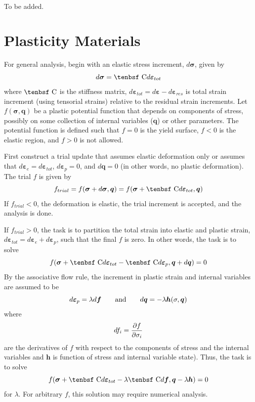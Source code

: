 \documentclass[11pt]{article}
\renewcommand{\vec}[1]{\boldsymbol{#1}}
\def\C{\hbox{\tenbsf C}}
\def\del{d \vec{\varepsilon}_{e}}
\def\dpl{d \vec{\varepsilon}_{p}}
\def\deff{d \vec{\varepsilon}_{tot}}
\def\df{d \vec{f}}
\def\dsig{d \vec{\sigma}}
\def\dq{d\vec q}
\begin{document}
To be added.

\section{Plasticity Materials}

For general analysis, begin with an elastic stress increment, $\dsig$, given by
\begin{equation}
    \dsig = \C \deff 
\end{equation}
where $\C$ is the stiffness matrix, $\deff=d\vec\varepsilon-d\vec\varepsilon_{res}$ is total strain increment (using tensorial strains) relative to the residual strain increments. Let $f(\vec{\sigma},\vec q)$ be a plastic potential function that depends on components of stress, possibly on some collection of internal variables ($\vec q$) or other parameters. The potential function is defined such that $f=0$ is the yield surface, $f<0$ is the elastic region, and $f>0$ is not allowed.

First construct a trial update that assumes elastic deformation only or assumes that $\del=\deff$, $\dpl=0$, and $d\vec q=0$ (in other words, no plastic deformation). The trial $f$ is given by\begin{equation}
       f_{trial} = f(\vec\sigma + \dsig,\vec q) = f(\vec\sigma + \C \deff ,\vec q)
\end{equation}
If $f_{trial}<0$, the deformation is elastic, the trial increment is accepted, and the analysis is done.

If $f_{trial}>0$, the task is to partition the total strain into elastic and plastic strain, $\deff=\del+\dpl$, such that the final $f$ is zero. In other words, the task is to solve
\begin{equation}
     f(\vec\sigma + \C \deff  - \C\dpl,\vec q + \dq) = 0
\end{equation}
By the associative flow rule, the increment in plastic strain and internal variables are assumed to be 
\begin{equation}
      \dpl = \lambda\df   \qquad {\rm and}\qquad \dq = -\lambda \vec h(\sigma,\vec q)
\end{equation}
where
\begin{equation}
      df_i = {\partial f\over \partial\sigma_i}   
\end{equation}
are the derivatives of $f$ with respect to the components of stress and the internal variables and $\vec h$ is function of stress and internal variable state). Thus, the task is to solve
\begin{equation}
     f(\vec\sigma + \C \deff - \lambda\C\df,\vec q -\lambda \vec h) = 0
\end{equation}
for $\lambda$. For arbitrary $f$, this solution may require numerical analysis.
\end{document}
